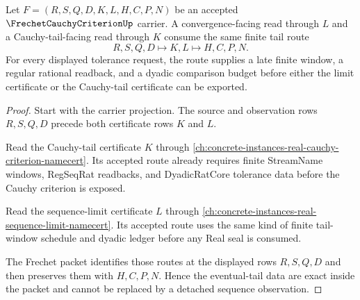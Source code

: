 \begin{theorem}
\label{thm:frechet-cauchy-criterion-eventual-tail-exactness}
Let $F=(R,S,Q,D,K,L,H,C,P,N)$ be an accepted $\FrechetCauchyCriterionUp$ carrier. A convergence-facing read through $L$ and a Cauchy-tail-facing read through $K$ consume the same finite tail route
$$
R,S,Q,D \longmapsto K,L \longmapsto H,C,P,N .
$$
For every displayed tolerance request, the route supplies a late finite window, a regular rational readback, and a dyadic comparison budget before either the limit certificate or the Cauchy-tail certificate can be exported.
\end{theorem}
\begin{proof}
Start with the carrier projection. The source and observation rows $R,S,Q,D$ precede both certificate rows $K$ and $L$.

Read the Cauchy-tail certificate $K$ through \autoref{ch:concrete-instances-real-cauchy-criterion-namecert}. Its accepted route already requires finite StreamName windows, RegSeqRat readbacks, and DyadicRatCore tolerance data before the Cauchy criterion is exposed.

Read the sequence-limit certificate $L$ through \autoref{ch:concrete-instances-real-sequence-limit-namecert}. Its accepted route uses the same kind of finite tail-window schedule and dyadic ledger before any Real seal is consumed.

The Frechet packet identifies those routes at the displayed rows $R,S,Q,D$ and then preserves them with $H,C,P,N$. Hence the eventual-tail data are exact inside the packet and cannot be replaced by a detached sequence observation.
\end{proof}

